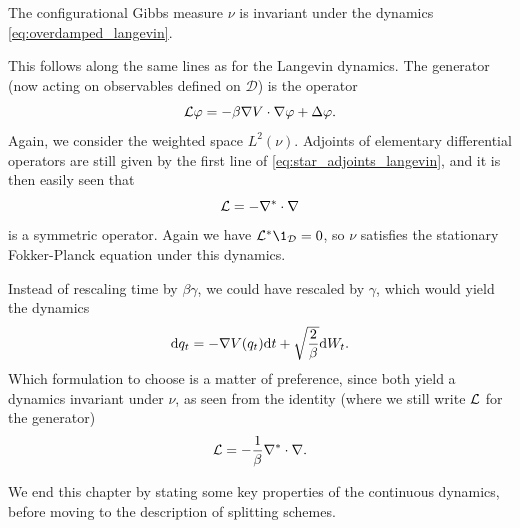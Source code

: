         \begin{prop}
            The configurational Gibbs measure $\nu$ is invariant under the dynamics \eqref{eq:overdamped_langevin}.
        \end{prop}
    
        This follows along the same lines as for the Langevin dynamics. The generator (now acting on observables defined on $\mathcal D$) is the operator
        \begin{equation}
            \label{eq:overdamped_langevin_generator}
            \mathcal{L}\varphi=-\beta\nabla V\cdot \nabla\varphi + \Delta \varphi.
        \end{equation}
        Again, we consider the weighted space $L^2(\nu)$. Adjoints of elementary differential operators are still given by the first line of \eqref{eq:star_adjoints_langevin}, and it is then easily seen that
        \begin{equation}
            \label{eq:L_overdamped_symmetric}
            \mathcal{L}=-\nabla^*\cdot\nabla
        \end{equation}
        is a symmetric operator. Again we have $\cL^*\1_{\mathcal D}=0$, so $\nu$ satisfies the stationary Fokker-Planck equation under this dynamics.
    
        \begin{remark}
            Instead of rescaling time by $\beta\gamma$, we could have rescaled by $\gamma$, which would yield the dynamics
            \begin{equation}
                \label{eq:overdamped_langevin_alt}
                \mathrm{d} q_t=-\nabla V(q_t)\mathrm{d} t+\sqrt{\frac 2\beta}\mathrm{d} W_t.
            \end{equation}
            Which formulation to choose is a matter of preference, since both yield a dynamics invariant under $\nu$, as seen from the identity (where we still write $\mathcal{L}$ for the generator)
            \[\mathcal{L}=-\frac1\beta\nabla^*\cdot\nabla.\]
        \end{remark}
        We end this chapter by stating some key properties of the continuous dynamics, before moving to the description of splitting schemes. 

